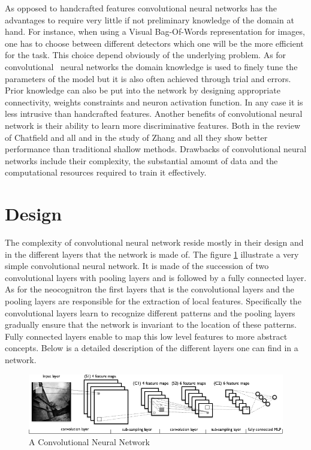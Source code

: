   As opposed to handcrafted features convolutional neural networks has the advantages to require very little if not preliminary knowledge of the domain at hand. For instance, when using a Visual Bag-Of-Words representation for images, one has to choose between different detectors which one will be the more efficient for the task. This choice depend obviously of the underlying problem. As for convolutional  neural networks the domain knowledge is used to finely tune the parameters of the model but it is also often achieved through trial and errors. Prior knowledge can also be put into the network by designing appropriate connectivity, weights constraints and neuron activation function. In any case it is less intrusive than handcrafted features. Another benefits of convolutional neural network is their ability to learn more discriminative features. Both in the review of Chatfield and all \cite{chatfield2014return} and in the study of Zhang and all \cite{zhang2007local} they show better performance than traditional shallow methods. Drawbacks of convolutional neural networks include their complexity, the substantial amount of data and the computational resources required to train it effectively.

  \section{Design}

  The complexity of convolutional neural network reside mostly in their design and in the different layers that the network is made of. The figure \ref{convnet} illustrate a very simple convolutional neural network. It is made of the succession of two convolutional layers with pooling layers and is followed by a fully connected layer. As for the neocognitron the first layers that is the convolutional layers and the pooling layers are responsible for the extraction of local features. Specifically the convolutional layers learn to recognize different patterns and the pooling layers gradually ensure that the network is invariant to the location of these patterns. Fully connected layers enable to map this low level features to more abstract concepts. Below is a detailed description of the different layers one can find in a network.

  \begin{figure}[h]
    \centering
      \includegraphics[width=1\textwidth]{images/convnet.png}
      \caption{A Convolutional Neural Network}
      \label{convnet}
  \end{figure}

